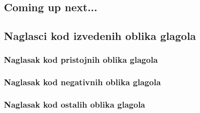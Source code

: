 \documentclass[12pt]{extarticle}
\begin{document}
	\subsection*{Coming up next...}
	\subsection{Naglasci kod izvedenih oblika glagola}
	\subsubsection{Naglasak kod pristojnih oblika glagola}
	\subsubsection{Naglasak kod negativnih oblika glagola}
	\subsubsection{Naglasak kod ostalih oblika glagola}
	
\end{document}
